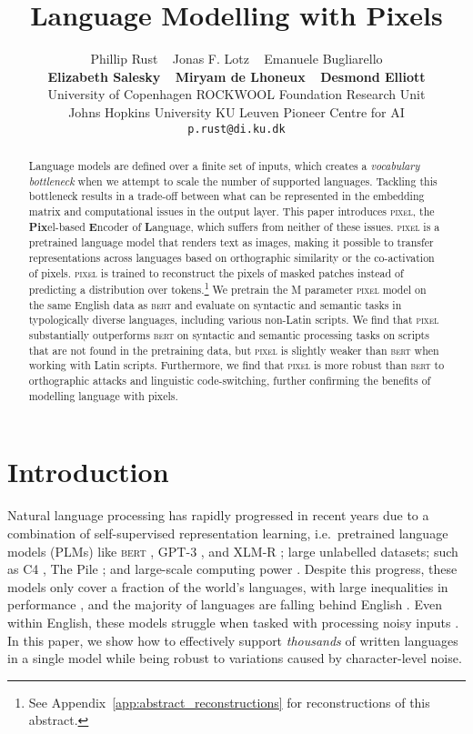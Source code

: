 \documentclass{article}
\title{Language Modelling with Pixels}
\author{Phillip Rust ~ Jonas F. Lotz ~ Emanuele Bugliarello \\ \textbf{Elizabeth Salesky} ~ \textbf{Miryam de Lhoneux} ~ \textbf{Desmond Elliott}\\
  University of Copenhagen \quad
  ROCKWOOL Foundation Research Unit \\
  Johns Hopkins University\quad
  KU Leuven \quad 
  Pioneer Centre for AI\\
\texttt{p.rust@di.ku.dk}
}
\newcommand{\model}{\textsc{pixel}\xspace}
\begin{document}
\maketitle

\begin{abstract}

Language models are defined over a finite set of inputs, which creates a \emph{vocabulary bottleneck} when we attempt to scale the number of supported languages. Tackling this bottleneck results in a trade-off between what can be represented in the embedding matrix and computational issues  in the output layer. This paper introduces \model, the \textbf{Pix}el-based \textbf{E}ncoder of \textbf{L}anguage, which suffers from neither of these issues. \model is a pretrained language model that renders text as images, making it possible to transfer representations across languages based on orthographic similarity or the co-activation of pixels. \model is trained to reconstruct the pixels of masked patches instead of predicting a distribution over tokens.\footnote{See Appendix~\ref{app:abstract_reconstructions} for reconstructions of this abstract.} We pretrain the M parameter \model model on the same English data as \textsc{bert} and evaluate on syntactic and semantic tasks in typologically diverse languages, including various non-Latin scripts.
We find that \model substantially outperforms \textsc{bert} on syntactic and semantic processing tasks on scripts that are not found in the pretraining data, but \model is slightly weaker than \textsc{bert} when working with Latin scripts. 
Furthermore, we find that \model is more robust than \textsc{bert} to orthographic attacks and linguistic code-switching, further confirming the benefits of modelling language with pixels. 


\end{abstract}

\section{Introduction}
\label{sec:intro}
\vspace{-2mm}

Natural language processing has rapidly progressed in recent years due to a combination of self-supervised representation learning, i.e.\ pretrained language models (PLMs) like \textsc{bert} \citep{devlin-etal-2019-bert}, GPT-3 \citep{brown-etal-2020-language}, and XLM-R \citep{conneau-etal-2020-unsupervised}; large unlabelled datasets; such as C4 \citep{raffel-etal-2020-t5}, The Pile \citep{gao2020pile}; and large-scale computing power \citep{hirschberg2015advances}.
Despite this progress, these models only cover a fraction of the world's languages, with large inequalities in performance \citep{pires-etal-2019-multilingual,lauscher-etal-2020-zero},   
and the majority of languages are falling behind English 
\citep{joshi-etal-2020-state,bugliarello-etal-2022-iglue}. Even within English, these models struggle when tasked with processing noisy inputs \citep{SunADV-BERT, eger-benz-2020-hero}.
In this paper, we show how to effectively support \textit{thousands} of written languages in a single model while being robust to variations caused by character-level noise.
\end{document}
